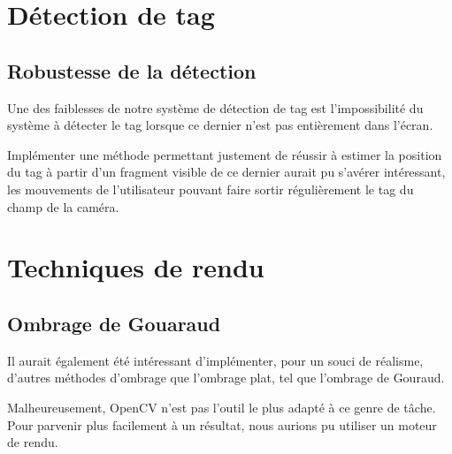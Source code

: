\newpage
{}

\section{Détection de tag}

    \subsection{Robustesse de la détection}

    Une des faiblesses de notre système de détection de tag est l'impossibilité du système à détecter le tag lorsque ce dernier n'est pas entièrement dans l'écran.

    Implémenter une méthode permettant justement de réussir à estimer la position du tag à partir d'un fragment visible de ce dernier aurait pu s'avérer intéressant, les mouvements de l'utilisateur pouvant faire sortir régulièrement le tag du champ de la caméra.

\section{Techniques de rendu}

    \subsection{Ombrage de Gouaraud}

    Il aurait également été intéressant d'implémenter, pour un souci de réalisme, d'autres méthodes d'ombrage que l'ombrage plat, tel que l'ombrage de Gouraud.

    Malheureusement, OpenCV n'est pas l'outil le plus adapté à ce genre de tâche. Pour parvenir plus facilement à un résultat, nous aurions pu utiliser un moteur de rendu.